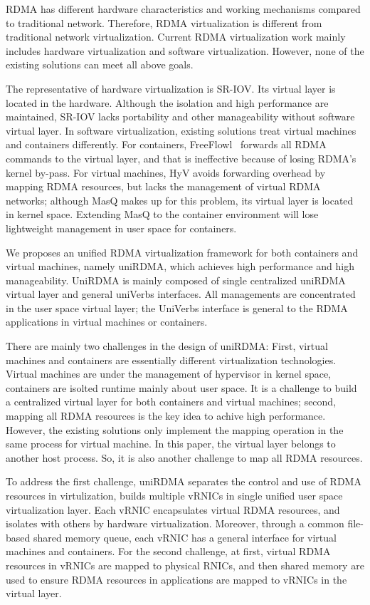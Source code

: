 RDMA has different hardware characteristics and working mechanisms compared to traditional network. Therefore, RDMA virtualization is different from traditional network virtualization. Current RDMA virtualization work mainly includes hardware virtualization and software virtualization. However, none of the existing solutions can meet all above goals.

The representative of hardware virtualization is SR-IOV. Its virtual layer is located in the hardware. Although the isolation and high performance are maintained,  SR-IOV lacks portability and other manageability without software virtual layer. In software virtualization, existing solutions treat virtual machines and containers differently. For containers, FreeFlowl~\cite{kim2019freeflow} forwards all RDMA commands to the virtual layer, and that is ineffective because of losing RDMA's kernel by-pass. For virtual machines, HyV avoids forwarding overhead by mapping RDMA resources, but lacks the management of virtual RDMA networks; although MasQ makes up for this problem, its virtual layer is located in kernel space. Extending MasQ to the container environment will lose lightweight  management in user space for containers.

We proposes an unified RDMA virtualization framework for both containers and virtual machines, namely uniRDMA, which achieves high performance and high manageability. UniRDMA is mainly composed of single centralized uniRDMA virtual layer and general uniVerbs interfaces. All managements are concentrated in the user space virtual layer; the UniVerbs interface is general to the RDMA applications in virtual machines or containers.

There are mainly two challenges in the design of uniRDMA: First, virtual machines and containers are essentially different virtualization technologies. Virtual machines are under the management of hypervisor in kernel space, containers are isolted runtime mainly about user space. It is a challenge to build a centralized virtual layer for both containers and virtual machines; second, mapping all RDMA resources is the key idea to achive high performance. However, the existing solutions only implement the mapping operation in the same process for virtual machine. In this paper, the virtual layer belongs to another host process. So, it is also another challenge to map all RDMA resources.

To address the first challenge, uniRDMA separates the control and use of RDMA resources in virtulization, builds multiple vRNICs in single unified user space virtualization layer. Each vRNIC encapsulates virtual RDMA resources, and isolates with others by hardware virtualization. Moreover, through a common file-based shared memory queue, each vRNIC has a general interface for virtual machines and containers. For the second challenge,  at first, virtual RDMA resources in vRNICs are mapped to physical RNICs, and then shared memory are used to ensure RDMA resources in applications are mapped to vRNICs in the virtual layer.

